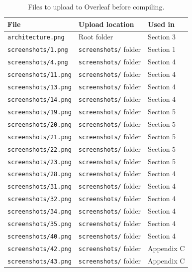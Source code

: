 \documentclass[12pt, a4paper]{article}
\begin{document}
\begin{table}[htbp]
\centering
\renewcommand{\arraystretch}{1.4}
\begin{tabular}{lll}
\toprule
\textbf{File} & \textbf{Upload location} & \textbf{Used in} \\
\midrule
\texttt{architecture.png}    & Root folder              & Section 3 \\
\texttt{screenshots/1.png}   & \texttt{screenshots/} folder & Section 1 \\
\texttt{screenshots/4.png}   & \texttt{screenshots/} folder & Section 4 \\
\texttt{screenshots/11.png}  & \texttt{screenshots/} folder & Section 4 \\
\texttt{screenshots/13.png}  & \texttt{screenshots/} folder & Section 4 \\
\texttt{screenshots/14.png}  & \texttt{screenshots/} folder & Section 4 \\
\texttt{screenshots/19.png}  & \texttt{screenshots/} folder & Section 5 \\
\texttt{screenshots/20.png}  & \texttt{screenshots/} folder & Section 5 \\
\texttt{screenshots/21.png}  & \texttt{screenshots/} folder & Section 5 \\
\texttt{screenshots/22.png}  & \texttt{screenshots/} folder & Section 5 \\
\texttt{screenshots/23.png}  & \texttt{screenshots/} folder & Section 5 \\
\texttt{screenshots/28.png}  & \texttt{screenshots/} folder & Section 4 \\
\texttt{screenshots/31.png}  & \texttt{screenshots/} folder & Section 4 \\
\texttt{screenshots/32.png}  & \texttt{screenshots/} folder & Section 4 \\
\texttt{screenshots/34.png}  & \texttt{screenshots/} folder & Section 4 \\
\texttt{screenshots/35.png}  & \texttt{screenshots/} folder & Section 4 \\
\texttt{screenshots/40.png}  & \texttt{screenshots/} folder & Section 4 \\
\texttt{screenshots/42.png}  & \texttt{screenshots/} folder & Appendix C \\
\texttt{screenshots/43.png}  & \texttt{screenshots/} folder & Appendix C \\
\bottomrule
\end{tabular}
\caption{Files to upload to Overleaf before compiling.}
\end{table}
\end{document}
